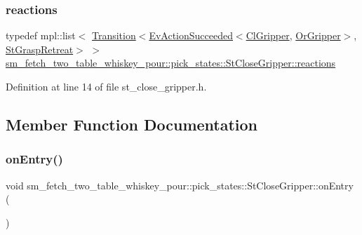 \subsubsection{\texorpdfstring{reactions}{reactions}}
{\footnotesize\ttfamily typedef mpl\+::list$<$ \hyperlink{classsmacc_1_1Transition}{Transition}$<$\hyperlink{structsmacc_1_1default__events_1_1EvActionSucceeded}{Ev\+Action\+Succeeded}$<$\hyperlink{classsm__fetch__two__table__whiskey__pour_1_1cl__gripper_1_1ClGripper}{Cl\+Gripper}, \hyperlink{classsm__fetch__two__table__whiskey__pour_1_1OrGripper}{Or\+Gripper}$>$, \hyperlink{structsm__fetch__two__table__whiskey__pour_1_1pick__states_1_1StGraspRetreat}{St\+Grasp\+Retreat}$>$ $>$ \hyperlink{structsm__fetch__two__table__whiskey__pour_1_1pick__states_1_1StCloseGripper_ab33193fa41ba71af1f9e8337b9627a78}{sm\+\_\+fetch\+\_\+two\+\_\+table\+\_\+whiskey\+\_\+pour\+::pick\+\_\+states\+::\+St\+Close\+Gripper\+::reactions}}



Definition at line 14 of file st\+\_\+close\+\_\+gripper.\+h.



\subsection{Member Function Documentation}
\mbox{\label{structsm__fetch__two__table__whiskey__pour_1_1pick__states_1_1StCloseGripper_a188341b5c268976c0e5f06a4ebea14ee}} 
\subsubsection{\texorpdfstring{on\+Entry()}{onEntry()}}
{\footnotesize\ttfamily void sm\+\_\+fetch\+\_\+two\+\_\+table\+\_\+whiskey\+\_\+pour\+::pick\+\_\+states\+::\+St\+Close\+Gripper\+::on\+Entry (\begin{DoxyParamCaption}{ }\end{DoxyParamCaption})\hspace{0.3cm}{\ttfamily [inline]}}



